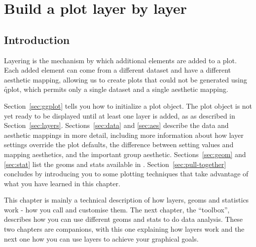 

% 


\chapter{Build a plot layer by layer}
\label{cha:layers}

\section{Introduction}


Layering is the mechanism by which additional elements are added to a plot.  Each added element can come from a different dataset and have a different aesthetic mapping, allowing us to create plots that could not be generated using \f{qplot}, which permits only a single dataset and a single aesthetic mapping.

Section~\ref{sec:ggplot} tells you how to initialize a plot object. The plot object is not yet ready to be displayed until at least one layer is added, as as described in Section~\ref{sec:layers}. Sections~\ref{sec:data} and \ref{sec:aes} describe the data and aesthetic mappings in more detail, including more information about how layer settings override the plot defaults, the difference between setting values and mapping aesthetics, and the important group aesthetic.  Sections~\ref{sec:geom} and \ref{sec:stat} list the geoms and stats available in \ggplot.  Section~\ref{sec:pull-together} concludes by introducing you to some plotting techniques that take advantage of what you have learned in this chapter.

This chapter is mainly a technical description of how layers, geoms and statistics work - how you call and customise them.  The next chapter, the \ggplot ``toolbox'', describes how you can use different geoms and stats to do data analysis. 
These two chapters are companions, with this one explaining how layers work and the next one how you can use layers to achieve your graphical goals.


